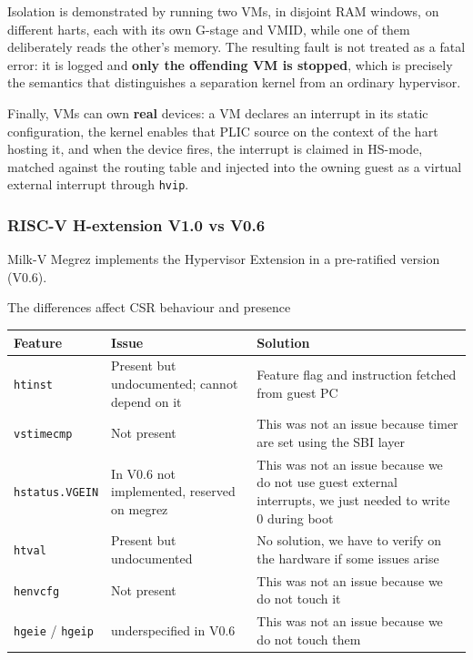 \documentclass[10pt,a4]{article}
\begin{document}
Isolation is demonstrated by running two VMs, in disjoint RAM windows, on
different harts, each with its own G-stage and VMID, while one of them
deliberately reads the other's memory. The resulting fault is not treated as a
fatal error: it is logged and \textbf{only the offending VM is stopped}, which is
precisely the semantics that distinguishes a separation kernel from an ordinary
hypervisor.

Finally, VMs can own \textbf{real} devices: a VM declares an interrupt in its
static configuration, the kernel enables that PLIC source on the context of the
hart hosting it, and when the device fires, the interrupt is claimed in HS-mode,
matched against the routing table and injected into the owning guest as a
virtual external interrupt through \texttt{hvip}.

\subsubsection*{RISC-V H-extension V1.0 vs V0.6}
\label{sec:hext}

Milk-V Megrez implements the Hypervisor Extension in a pre-ratified version (V0.6).

The differences affect CSR behaviour and presence

\begin{table}[h!]
\centering
\begin{tabular}{ l p{4.5cm} p{7.0cm} }
\textbf{Feature} & \textbf{Issue} & \textbf{Solution} \\
\hline
\texttt{htinst} & Present but undocumented; cannot depend on it & 
Feature flag and instruction fetched from guest PC \\
\texttt{vstimecmp} & Not present & This was not an issue because timer are set using the SBI layer \\
\texttt{hstatus.VGEIN} & In V0.6 not implemented, reserved on megrez & This was not an issue because
we do not use guest external interrupts, we just needed to write 0 during boot \\
\texttt{htval} & Present but undocumented & No solution, we have to verify on the hardware if some 
issues arise \\
\texttt{henvcfg} & Not present & This was not an issue because we do not touch it \\
\texttt{hgeie} / \texttt{hgeip} & underspecified in V0.6 & This was not an issue because we do not 
touch them \\
\end{tabular}
\end{table}
\end{document}
